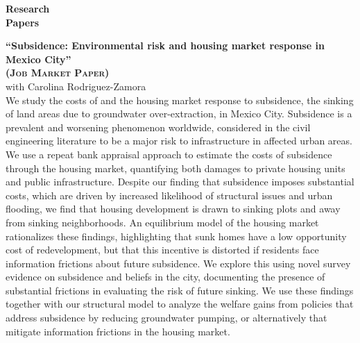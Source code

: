 \documentclass[10pt, oneside]{article}
\begin{document}
\begin{minipage}[t]{0.1\linewidth}
\textbf{Research \\ Papers}
\end{minipage}\hspace{0.05\linewidth}
\begin{minipage}[t]{0.8\linewidth}
\textbf{``Subsidence: Environmental risk and housing market response in Mexico City''\\ 
(\textsc{Job Market Paper})}\\ 
 with Carolina Rodriguez-Zamora \\

We study the costs of and the housing market response to subsidence, the sinking of land areas due to groundwater over-extraction, in Mexico City. Subsidence is a prevalent and worsening phenomenon worldwide, considered in the civil engineering literature to be a major risk to infrastructure in affected urban areas. We use a repeat bank appraisal approach to estimate the costs of subsidence through the housing market, quantifying both damages to private housing units and public infrastructure. Despite our finding that subsidence imposes substantial costs, which are driven by increased likelihood of structural issues and urban flooding, we find that housing development is drawn to sinking plots and away from sinking neighborhoods. An equilibrium model of the housing market rationalizes these findings, highlighting that sunk homes have a low opportunity cost of redevelopment, but that this incentive is distorted if residents face information frictions about future subsidence. We explore this using novel survey evidence on subsidence and beliefs in the city, documenting the presence of substantial frictions in evaluating the risk of future sinking. We use these findings together with our structural model to analyze the welfare gains from policies that address subsidence by reducing groundwater pumping, or alternatively that mitigate information frictions in the housing market.

\end{minipage}\vspace{5mm}
\end{document}
